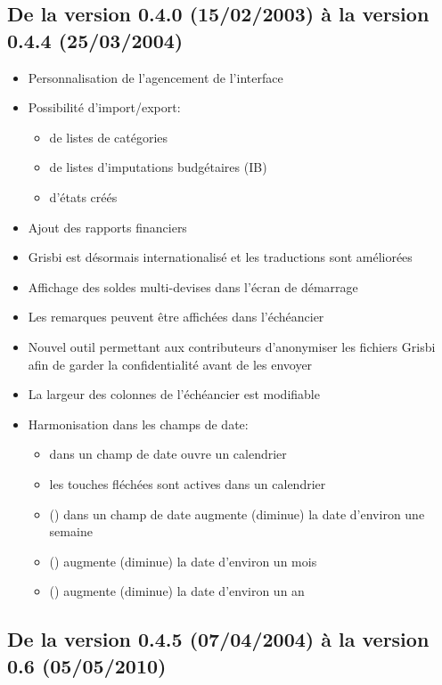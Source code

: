 
\subsection{De la version 0.4.0 \textnormal{(15/02/2003)} à la version 0.4.4 \textnormal{(25/03/2004)}}

\begin{itemize}
	\item Personnalisation de l'agencement de l'interface
	\item Possibilité d'import/export:
		\begin{itemize}
		\item de listes de catégories
		\item de listes d'imputations budgétaires (IB)
		\item d'états créés
		\end{itemize}	
	\item Ajout des rapports financiers
	\item Grisbi est désormais internationalisé et les traductions sont améliorées
	\item Affichage des soldes multi-devises dans l'écran de démarrage
	\item Les remarques peuvent être affichées dans l'échéancier
	\item Nouvel outil permettant aux contributeurs d'anonymiser les fichiers Grisbi afin de garder la confidentialité avant de les envoyer
	\item La largeur des colonnes de l'échéancier est modifiable
	\item Harmonisation dans les champs de date:
		\begin{itemize}
		\item {} dans un champ de date ouvre un calendrier
		\item les touches fléchées sont actives dans un calendrier
		\item {} () dans un champ de date augmente (diminue) la date d'environ une semaine
		\item {} () augmente (diminue) la date d'environ un mois
		\item {} () augmente (diminue) la date d'environ un an
		\end{itemize}	
\end{itemize}

\subsection{De la version 0.4.5 \textnormal{(07/04/2004)} à la version 0.6 \textnormal{(05/05/2010)}}

